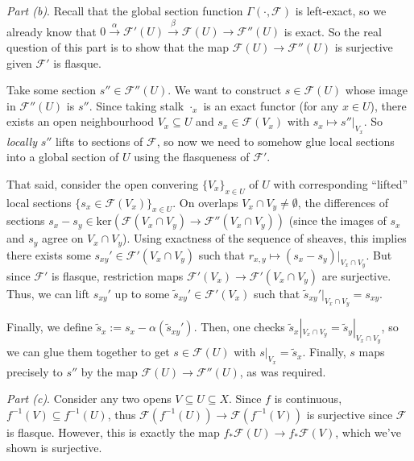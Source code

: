 \documentclass{template}
\begin{document}
\textcolor{blue!70!black}{\textit{Part (b)}}. Recall that the global section
function $\Gamma(\cdot,\mathcal{F})$ is left-exact, so we already know that $0
\xrightarrow{\alpha} \mathcal{F}'(U) \xrightarrow{\beta} \mathcal{F}(U) \to
\mathcal{F}''(U)$ is exact. So the real question of this part is to show that
the map $\mathcal{F}(U) \to \mathcal{F}''(U)$ is surjective given $\mathcal{F}'$
is flasque.

Take some section $s'' \in \mathcal{F}''(U)$. We want to construct $s \in
\mathcal{F}(U)$ whose image in $\mathcal{F}''(U)$ is $s''$. Since taking stalk
$\cdot_x$ is an exact functor (for any $x \in U$), there exists an open
neighbourhood $V_x \subseteq U$ and $s_x \in \mathcal{F}(V_x)$ with $s_x \mapsto
s''|_{V_x}$. So \textit{locally} $s''$ lifts to sections of $\mathcal{F}$, so now we
need to somehow glue local sections into a global section of $U$ using 
the flasqueness of $\mathcal{F}'$.

That said, consider the open convering $\{V_x\}_{x \in U}$ of $U$ with
corresponding ``lifted'' local sections $\{s_x \in \mathcal{F}(V_x)\}_{x \in
U}$. On overlaps $V_x \cap V_y \neq \emptyset$, the differences of sections
$s_x-s_y \in \text{ker}(\mathcal{F}(V_x \cap V_y) \to \mathcal{F}''(V_x \cap
V_y))$ (since the images of $s_x$ and $s_y$ agree on $V_x \cap V_y$). Using
exactness of the sequence of sheaves, this implies there exists some $s_{xy}'
\in \mathcal{F}'(V_x \cap V_y)$ such that $r_{x,y} \mapsto (s_x - s_y)|_{V_x
\cap V_y}$. But since $\mathcal{F}'$ is flasque, restriction maps
$\mathcal{F}'(V_x) \to \mathcal{F}'(V_x \cap V_y)$ are surjective. Thus, we can
lift $s_{xy}'$ up to some $\widetilde{s}_{xy}' \in \mathcal{F}'(V_x)$ such that
$\widetilde{s}_{xy}'|_{V_x \cap V_y} = s_{xy}$.

Finally, we define \textcolor{orange!85!black}{$\widetilde{s}_x := s_x -
\alpha(\widetilde{s}_{xy}')$}. Then, one checks $\widetilde{s}_x|_{V_x \cap V_y}
= \widetilde{s}_y|_{V_x \cap V_y}$, so we can glue them together to get $s \in
\mathcal{F}(U)$ with $s|_{V_x}=\widetilde{s}_x$. Finally, $s$ maps precisely to
$s''$ by the map $\mathcal{F}(U) \to \mathcal{F}''(U)$, as was required.

\textcolor{blue!70!black}{\textit{Part (c)}}. Consider any two opens $V
\subseteq U \subseteq X$. Since $f$ is continuous, $f^{-1}(V) \subseteq
f^{-1}(U)$, thus $\mathcal{F}(f^{-1}(U)) \to \mathcal{F}(f^{-1}(V))$ is
surjective since $\mathcal{F}$ is flasque. However, this is exactly the map
$f_*\mathcal{F}(U) \to f_*\mathcal{F}(V)$, which we've shown is surjective.
\end{document}

